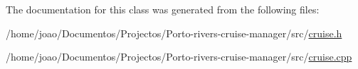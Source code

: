 The documentation for this class was generated from the following files\+:\begin{DoxyCompactItemize}
\item 
/home/joao/\+Documentos/\+Projectos/\+Porto-\/rivers-\/cruise-\/manager/src/\hyperlink{cruise_8h}{cruise.\+h}\item 
/home/joao/\+Documentos/\+Projectos/\+Porto-\/rivers-\/cruise-\/manager/src/\hyperlink{cruise_8cpp}{cruise.\+cpp}\end{DoxyCompactItemize}
